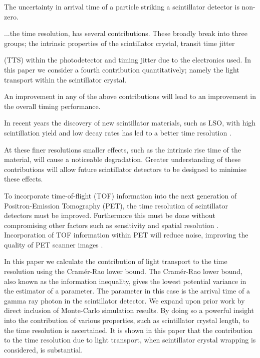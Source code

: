 The uncertainty in arrival time of a particle striking a scintillator detector is non-zero. 


...the time resolution, has several contributions. These broadly break into three groups; the intrinsic properties of the scintillator crystal, transit time jitter %

(TTS) within the photodetector and timing jitter due to the electronics used. In this paper we consider a fourth contribution quantitatively; namely the light transport within the scintillator crystal. 

An improvement in any of the above contributions will lead to an improvement in the overall timing performance.

In recent years the discovery of new scintillator materials, such as LSO, with high scintillation yield and low decay rates has led to a better time resolution \cite{Dorenbos2010a,Conti2009a}. 

At these finer resolutions smaller effects, such as the intrinsic rise time of the material, will cause a noticeable degradation. Greater understanding of these contributions will allow future scintillator detectors to be designed to minimise these effects. 

To incorporate time-of-flight (TOF) information into the next generation of Positron-Emission Tomography (PET), the time resolution of scintillator detectors must be improved. Furthermore this must be done without compromising other factors such as sensitivity and spatial resolution \cite{Eriksson2004}. Incorporation of TOF information within PET will reduce noise, improving the quality of PET scanner images \cite{Geramifar2011}.

In this paper we calculate the contribution of light transport to the time resolution using the Cram\'{e}r-Rao lower bound. The Cram\'{e}r-Rao lower bound, also known as the information inequality, gives the lowest potential variance in the estimator of a parameter. The parameter in this case is the arrival time of a
gamma ray photon in the scintillator detector. We expand upon prior work \cite{Seifert2012} by direct inclusion of Monte-Carlo simulation results. By doing so a powerful insight into the contribution of various properties, such as scintillator crystal length, to the time resolution is ascertained. It is shown in this paper that the contribution to the time resolution due to light transport, when scintillator crystal wrapping is considered, is substantial.